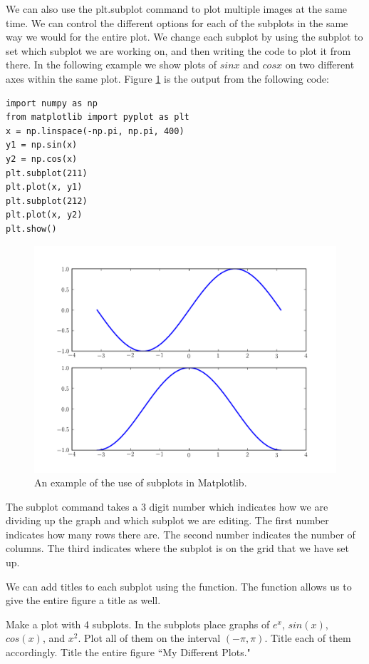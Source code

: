 We can also use the plt.subplot command to plot multiple images at the same time.
We can control the different options for each of the subplots in the same way we would for the entire plot.
We change each subplot by using the subplot to set which subplot we are working on, and then writing the code to plot it from there.
In the following example we show plots of $sin x$ and $cos x$ on two different axes within the same plot.
Figure \ref{mpl:subplots} is the output from the following code:
\begin{lstlisting}
import numpy as np
from matplotlib import pyplot as plt
x = np.linspace(-np.pi, np.pi, 400)
y1 = np.sin(x)
y2 = np.cos(x)
plt.subplot(211)
plt.plot(x, y1)
plt.subplot(212)
plt.plot(x, y2)
plt.show()
\end{lstlisting}

\begin{figure}
\includegraphics[width=\textwidth]{subplots.pdf}
\caption{An example of the use of subplots in Matplotlib.}
\label{mpl:subplots}
\end{figure}

The subplot command takes a 3 digit number which indicates how we are dividing up the graph and which subplot we are editing.
The first number indicates how many rows there are.
The second number indicates the number of columns.
The third indicates where the subplot is on the grid that we have set up. 

We can add titles to each subplot using the  function.
The  function allows us to give the entire figure a title as well.

\begin{problem}
Make a plot with 4 subplots.
In the subplots place graphs of $e^x$, $sin(x)$, $cos(x)$, and $x^2$.
Plot all of them on the interval $(-\pi,\pi)$.
Title each of them accordingly.
Title the entire figure ``My Different Plots."
\end{problem}
